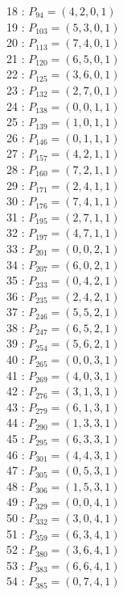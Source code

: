 \documentclass{article}
\begin{document}
{\begin{multicols}{3}
18 : $P_{94}=( 4, 2, 0, 1 )$\\
19 : $P_{103}=( 5, 3, 0, 1 )$\\
20 : $P_{113}=( 7, 4, 0, 1 )$\\
21 : $P_{120}=( 6, 5, 0, 1 )$\\
22 : $P_{125}=( 3, 6, 0, 1 )$\\
23 : $P_{132}=( 2, 7, 0, 1 )$\\
24 : $P_{138}=( 0, 0, 1, 1 )$\\
25 : $P_{139}=( 1, 0, 1, 1 )$\\
26 : $P_{146}=( 0, 1, 1, 1 )$\\
27 : $P_{157}=( 4, 2, 1, 1 )$\\
28 : $P_{160}=( 7, 2, 1, 1 )$\\
29 : $P_{171}=( 2, 4, 1, 1 )$\\
30 : $P_{176}=( 7, 4, 1, 1 )$\\
31 : $P_{195}=( 2, 7, 1, 1 )$\\
32 : $P_{197}=( 4, 7, 1, 1 )$\\
33 : $P_{201}=( 0, 0, 2, 1 )$\\
34 : $P_{207}=( 6, 0, 2, 1 )$\\
35 : $P_{233}=( 0, 4, 2, 1 )$\\
36 : $P_{235}=( 2, 4, 2, 1 )$\\
37 : $P_{246}=( 5, 5, 2, 1 )$\\
38 : $P_{247}=( 6, 5, 2, 1 )$\\
39 : $P_{254}=( 5, 6, 2, 1 )$\\
40 : $P_{265}=( 0, 0, 3, 1 )$\\
41 : $P_{269}=( 4, 0, 3, 1 )$\\
42 : $P_{276}=( 3, 1, 3, 1 )$\\
43 : $P_{279}=( 6, 1, 3, 1 )$\\
44 : $P_{290}=( 1, 3, 3, 1 )$\\
45 : $P_{295}=( 6, 3, 3, 1 )$\\
46 : $P_{301}=( 4, 4, 3, 1 )$\\
47 : $P_{305}=( 0, 5, 3, 1 )$\\
48 : $P_{306}=( 1, 5, 3, 1 )$\\
49 : $P_{329}=( 0, 0, 4, 1 )$\\
50 : $P_{332}=( 3, 0, 4, 1 )$\\
51 : $P_{359}=( 6, 3, 4, 1 )$\\
52 : $P_{380}=( 3, 6, 4, 1 )$\\
53 : $P_{383}=( 6, 6, 4, 1 )$\\
54 : $P_{385}=( 0, 7, 4, 1 )$\\

\end{multicols}}
\end{document}
